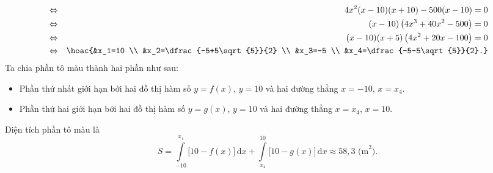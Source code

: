 \begin{ex}
{\begin{eqnarray*}
			&\Leftrightarrow& 4x^2(x-10)(x+10)-500(x-10)=0 \\
			&\Leftrightarrow& (x-10)\left(4x^3+40x^2-500\right)=0 \\
			&\Leftrightarrow& (x-10)(x+5)\left(4x^2+20x-100\right)=0 \\
			&\Leftrightarrow& \hoac{&x_1=10 \\ &x_2=\dfrac{-5+5\sqrt{5}}{2} \\ &x_3=-5 \\ &x_4=\dfrac{-5-5\sqrt{5}}{2}.}
		\end{eqnarray*}
		Ta chia phần tô màu thành hai phần như sau:
		\begin{itemize}
			\item Phần thứ nhất giới hạn bởi hai đồ thị hàm số $y=f(x)$, $y=10$ và hai đường thẳng $x=-10$, $x=x_4$.
			\item Phần thứ hai giới hạn bởi hai đồ thị hàm số $y=g(x)$, $y=10$ và hai đường thẳng $x=x_4$, $x=10$.
		\end{itemize}
		Diện tích phần tô màu là
		\[S=\displaystyle\int\limits_{-10}^{x_4} \big[10-f(x)\big]\mathrm{\,d}x+\displaystyle\int\limits_{x_4}^{10} \big[10-g(x)\big]\mathrm{\,d}x \approx 58{,}3 \text{ (m}^2\text{)}.\]
	}
\end{ex}

